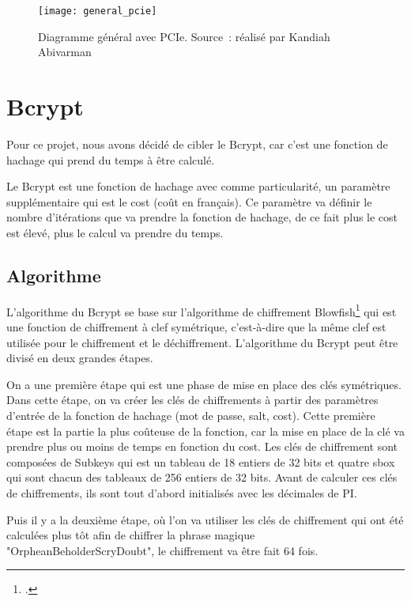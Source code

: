 \begin{figure}[tbph!]
	\centering
	\texttt{[image: general\_pcie]}
	\caption[Diagramme général avec PCIe]{Diagramme général avec PCIe. Source : réalisé par Kandiah Abivarman}
	\label{fig:general_pcie}
\end{figure}

\newpage

\section{Bcrypt}

Pour ce projet, nous avons décidé de cibler le Bcrypt, car c'est une fonction de hachage qui prend du temps à être calculé. 

Le Bcrypt est une fonction de hachage avec comme particularité, un paramètre supplémentaire qui est le cost (coût en français).
Ce paramètre va définir le nombre d'itérations que va prendre la fonction de hachage, de ce fait plus le cost est élevé, plus le calcul va prendre du temps.

\subsection{Algorithme}

L'algorithme du Bcrypt se base sur l'algorithme de chiffrement Blowfish\footcite{noauthor_blowfish_2019} qui est une fonction de chiffrement à clef symétrique, c'est-à-dire que la même clef est utilisée pour le chiffrement et le déchiffrement. 
L'algorithme du Bcrypt peut être divisé en deux grandes étapes.

On a une première étape qui est une phase de mise en place des clés symétriques. 
Dans cette étape, on va créer les clés de chiffrements à partir des paramètres d'entrée de la fonction de hachage (mot de passe, salt, cost). 
Cette première étape est la partie la plus coûteuse de la fonction, car la mise en place de la clé va prendre plus ou moins de temps en fonction du cost. 
Les clés de chiffrement sont composées de Subkeys qui est un tableau de 18 entiers de 32 bits et quatre \gls{sbox} qui sont chacun des tableaux de 256 entiers de 32 bits. 
Avant de calculer ces clés de chiffrements, ils sont tout d'abord initialisés avec les décimales de PI.

Puis il y a la deuxième étape, où l'on va utiliser les clés de chiffrement qui ont été calculées plus tôt afin de chiffrer la phrase magique "OrpheanBeholderScryDoubt", le chiffrement va être fait 64 fois.

